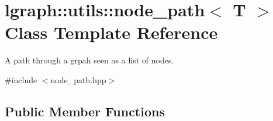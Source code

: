 \hypertarget{classlgraph_1_1utils_1_1node__path}{\section{lgraph\-:\-:utils\-:\-:node\-\_\-path$<$ T $>$ Class Template Reference}
\label{classlgraph_1_1utils_1_1node__path}
}


A path through a grpah seen as a list of nodes.  




{\ttfamily \#include $<$node\-\_\-path.\-hpp$>$}

\subsection*{Public Member Functions}
